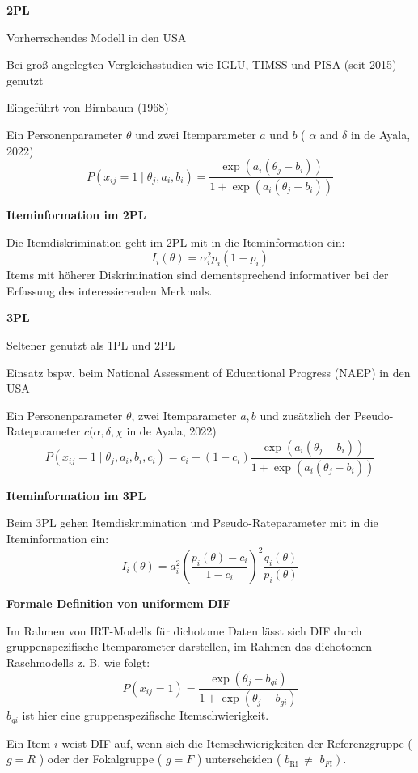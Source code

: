 \documentclass[10pt, letterpaper]{article}
\begin{document}
\textbf{2PL}

Vorherrschendes Modell in den USA

Bei groß angelegten Vergleichsstudien wie IGLU, TIMSS und PISA (seit 2015) genutzt

Eingeführt von Birnbaum (1968)

Ein Personenparameter $\theta$ und zwei Itemparameter $a$ und $b$ ( $\alpha$ and $\delta$ in de Ayala, 2022)
$$
P\left(x_{i j}=1 \mid \theta_j, a_i, b_i\right)=\frac{\exp \left(a_i\left(\theta_j-b_i\right)\right)}{1+\exp \left(a_i\left(\theta_j-b_i\right)\right)}
$$




\textbf{Iteminformation im 2PL}

Die Itemdiskrimination geht im 2PL mit in die Iteminformation ein:
$$
I_i(\theta)=\alpha_i^2 p_i\left(1-p_i\right)
$$
Items mit höherer Diskrimination sind dementsprechend informativer bei der Erfassung des interessierenden Merkmals.
\vspace{0.4cm}

\textbf{3PL}

Seltener genutzt als 1PL und 2PL

Einsatz bspw. beim National Assessment of Educational Progress (NAEP) in den USA

Ein Personenparameter $\theta$, zwei Itemparameter $a, b$ und zusätzlich der Pseudo-Rateparameter $c(\alpha, \delta, \chi$ in de Ayala, 2022)
$$
P\left(x_{i j}=1 \mid \theta_j, a_i, b_i, c_i\right)=c_i+\left(1-c_i\right) \frac{\exp \left(a_i\left(\theta_j-b_i\right)\right)}{1+\exp \left(a_i\left(\theta_j-b_i\right)\right)}
$$

\pagebreak

\textbf{Iteminformation im 3PL}


Beim 3PL gehen Itemdiskrimination und Pseudo-Rateparameter mit in die Iteminformation ein:
$$
I_i(\theta)=a_i^2\left(\frac{p_i(\theta)-c_i}{1-c_i}\right)^2 \frac{q_i(\theta)}{p_i(\theta)}
$$


\textbf{Formale Definition von uniformem DIF}

Im Rahmen von IRT-Modells für dichotome Daten lässt sich DIF durch gruppenspezifische Itemparameter darstellen, im Rahmen das dichotomen Raschmodells z. B. wie folgt:
$$
P\left(x_{i j}=1\right)=\frac{\exp \left(\theta_j-b_{g i}\right)}{1+\exp \left(\theta_j-b_{g i}\right)}
$$
$b_{g i}$ ist hier eine gruppenspezifische Itemschwierigkeit.

Ein Item $i$ weist DIF auf, wenn sich die Itemschwierigkeiten der Referenzgruppe ( $g=R$ ) oder der Fokalgruppe ( $g=F$ ) unterscheiden ( $b_{\text {Ri }} \neq$ $\left.b_{F i}\right)$.
\vspace{0.4cm}
\end{document}
